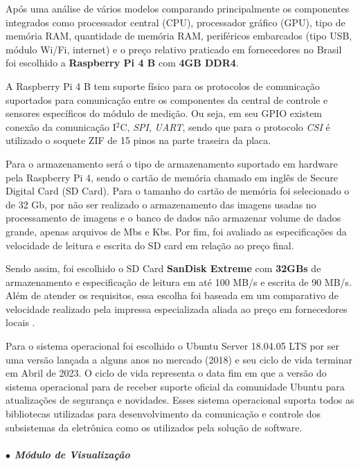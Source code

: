     Após uma análise de vários modelos comparando principalmente os componentes integrados como processador central (CPU), processador gráfico (GPU), tipo de memória RAM, quantidade de memória RAM, periféricos embarcados (tipo USB, módulo Wi/Fi, internet) e o preço relativo praticado em fornecedores no Brasil foi escolhido a \textbf{Raspberry Pi 4 B} com \textbf{4GB DDR4}. 
    
    A Raspberry Pi 4 B tem suporte físico para os protocolos de comunicação suportados para comunicação entre os componentes da central de controle e sensores específicos do módulo de medição. Ou seja, em seu GPIO existem conexão da comunicação I$^2$C, \textit{SPI}, \textit{UART}, sendo que para o protocolo \textit{CSI} é utilizado o soquete ZIF de 15 pinos na parte traseira da placa. 
    
    Para o armazenamento será o tipo de armazenamento suportado em hardware pela Raspberry Pi 4, sendo o cartão de memória chamado em inglês de Secure Digital Card (SD Card). Para o tamanho do cartão de memória foi selecionado o de 32 Gb, por não ser realizado o armazenamento das imagens usadas no processamento de imagens e o banco de dados não armazenar volume de dados grande, apenas arquivos de Mbs e Kbs. Por fim, foi avaliado as especificações da velocidade de leitura e escrita do SD card em relação ao preço final. 
    
    Sendo assim, foi escolhido o SD Card \textbf{SanDisk Extreme} com \textbf{32GBs} de armazenamento e especificação de leitura em até 100 MB/s e escrita de 90 MB/s. Além de atender os requisitos, essa escolha foi baseada em um comparativo de velocidade realizado pela impressa especializada aliada ao preço em fornecedores locais \cite{sdcard_benchmark}. 
    
    Para o sistema operacional foi escolhido o Ubuntu Server 18.04.05 LTS por ser uma versão lançada a alguns anos no mercado (2018) e seu ciclo de vida terminar em Abril de 2023. O ciclo de vida representa o data fim em que a versão do sistema operacional para de receber suporte oficial da comunidade Ubuntu para atualizações de segurança e novidades. Esses sistema operacional suporta todos as bibliotecas utilizadas para desenvolvimento da comunicação e controle dos subsistemas da eletrônica como os utilizados pela solução de software.
    
    
    \subparagraph*{$\bullet$ Módulo de Visualização} \hfill
    
